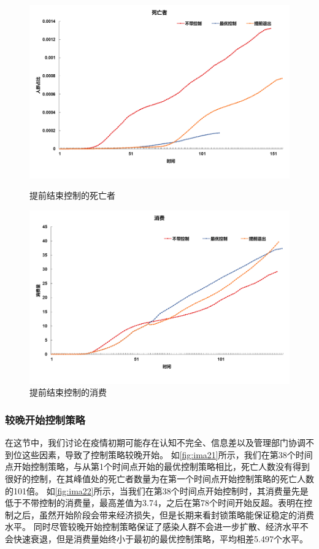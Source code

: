 \begin{figure}[htbp]
    \begin{minipage}{0.49\linewidth}
		\centering
		\includegraphics[width=0.9\linewidth]{fig/image030.png}
		\caption{提前结束控制的死亡者}
		\label{fig:ima15}%
	\end{minipage}
	\begin{minipage}{0.49\linewidth}
		\centering
		\includegraphics[width=0.9\linewidth]{fig/image022.png}
		\caption{提前结束控制的消费}
		\label{fig:ima16}%
	\end{minipage}
\end{figure}

\subsubsection{较晚开始控制策略}
在这节中，我们讨论在疫情初期可能存在认知不完全、信息差以及管理部门协调不到位这些因素，导致了控制策略较晚开始。
如\autoref{fig:ima21}所示，我们在第38个时间点开始控制策略，与从第1个时间点开始的最优控制策略相比，死亡人数没有得到很好的控制，在其峰值处的死亡者数量为在第一个时间点开始控制策略的死亡人数的101倍。
如\autoref{fig:ima22}所示，当我们在第38个时间点开始控制时，其消费量先是低于不带控制的消费量，最高差值为3.74，之后在第78个时间开始反超。表明在控制之后，虽然开始阶段会带来经济损失，但是长期来看封锁策略能保证稳定的消费水平。
同时尽管较晚开始控制策略保证了感染人群不会进一步扩散、经济水平不会快速衰退，但是消费量始终小于最初的最优控制策略，平均相差5.497个水平。

